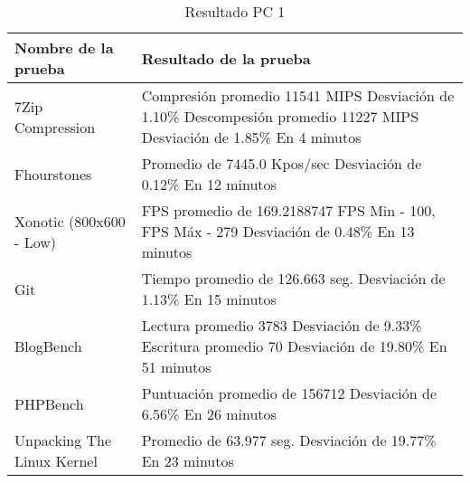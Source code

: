 \documentclass[12pt]{article}
\begin{document}
\begin{table}[!htb]
    \centering
    \begin{tabular}{|p{5cm}|p{9cm}|}
        \hline
        \textbf{Nombre de la prueba} & \textbf{Resultado de la prueba}\\
        \hline
        7Zip Compression &  Compresión promedio 11541 MIPS \newline
        Desviación de 1.10\% \newline
        Descompesión promedio 11227 MIPS \newline
        Desviación de 1.85\%
        En 4 minutos\\
        \hline
        Fhourstones &  Promedio de 7445.0 Kpos/sec \newline
        Desviación de 0.12\% \newline
        En 12 minutos\\
        \hline
        Xonotic (800x600 - Low) &  FPS promedio de 169.2188747 \newline
        FPS Min - 100, FPS Máx - 279 \newline
        Desviación de 0.48\% \newline
        En 13 minutos\\
        \hline
        Git &  Tiempo promedio de 126.663 seg. \newline
        Desviación de 1.13\% \newline
        En 15 minutos\\
        \hline
        BlogBench & Lectura promedio 3783 \newline
        Desviación de 9.33\% \newline
        Escritura promedio 70 \newline
        Desviación de 19.80\% \newline
        En 51 minutos\\
        \hline
        PHPBench & Puntuación promedio de 156712 \newline
        Desviación de 6.56\% \newline
        En 26 minutos\\
        \hline
        Unpacking The Linux Kernel &  Promedio de 63.977 seg. \newline
        Desviación de 19.77\% \newline
        En 23 minutos\\
        \hline
    \end{tabular}
    \caption{Resultado PC 1}
\end{table}
\end{document}
